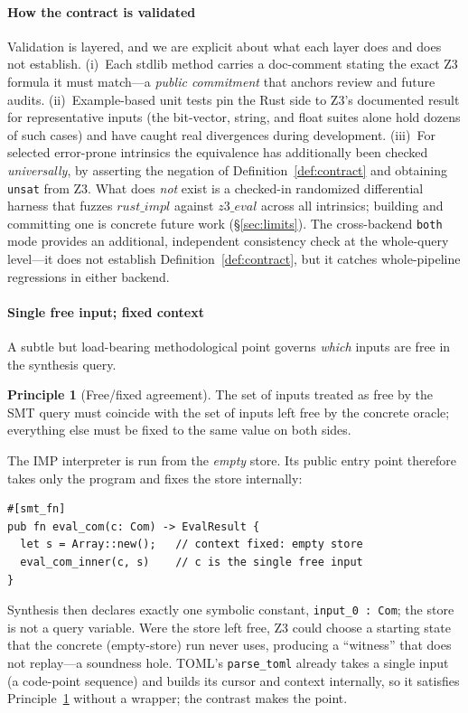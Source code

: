 \documentclass[sigplan,review,anonymous]{acmart}
\theoremstyle{definition}
\newtheorem{principle}{Principle}
\theoremstyle{remark}
\newcommand{\imp}{IMP}
\newcommand{\toml}{TOML}
\newcommand{\code}[1]{\texttt{#1}}
\begin{document}
\paragraph{How the contract is validated}
Validation is layered, and we are explicit about what each layer does and does
not establish. (i)~Each stdlib method carries a doc-comment stating the exact Z3
formula it must match---a \emph{public commitment} that anchors review and future
audits. (ii)~Example-based unit tests pin the Rust side to Z3's documented result
for representative inputs (the bit-vector, string, and float suites alone hold
dozens of such cases) and have caught real divergences during development.
(iii)~For selected error-prone intrinsics the equivalence has additionally been
checked \emph{universally}, by asserting the negation of
Definition~\ref{def:contract} and obtaining \code{unsat} from Z3. What does
\emph{not} exist is a checked-in randomized differential harness that fuzzes
$\mathit{rust\_impl}$ against $\mathit{z3\_eval}$ across all intrinsics; building
and committing one is concrete future work (\S\ref{sec:limits}). The cross-backend
\code{both} mode provides an additional, independent consistency check at the
whole-query level---it does not establish Definition~\ref{def:contract}, but it
catches whole-pipeline regressions in either backend.

\paragraph{Single free input; fixed context}
A subtle but load-bearing methodological point governs \emph{which} inputs are
free in the synthesis query.
\begin{principle}[Free/fixed agreement]\label{prin:free}
The set of inputs treated as free by the SMT query must coincide with the set of
inputs left free by the concrete oracle; everything else must be fixed to the
same value on both sides.
\end{principle}
The \imp{} interpreter is run from the \emph{empty} store. Its public entry point
therefore takes only the program and fixes the store internally:
\begin{lstlisting}[style=rust]
#[smt_fn]
pub fn eval_com(c: Com) -> EvalResult {
  let s = Array::new();   // context fixed: empty store
  eval_com_inner(c, s)    // c is the single free input
}
\end{lstlisting}
Synthesis then declares exactly one symbolic constant, \code{input\_0 : Com}; the
store is not a query variable. Were the store left free, Z3 could choose a
starting state that the concrete (empty-store) run never uses, producing a
``witness'' that does not replay---a soundness hole. \toml{}'s \code{parse\_toml}
already takes a single input (a code-point sequence) and builds its cursor and
context internally, so it satisfies Principle~\ref{prin:free} without a wrapper;
the contrast makes the point.
\end{document}
